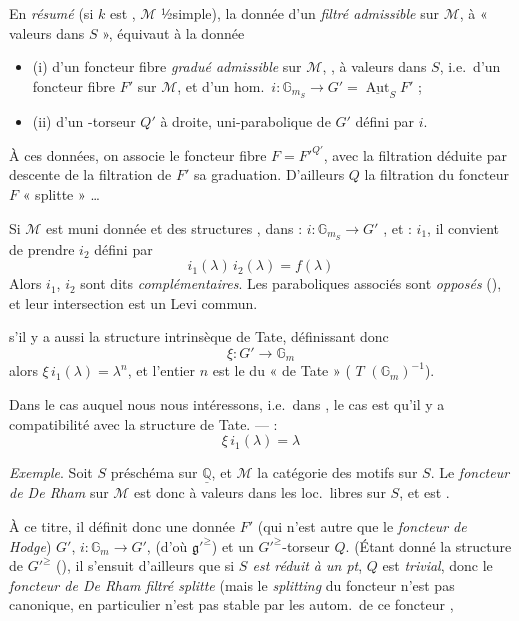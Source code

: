 \documentclass[11pt,a4paper]{article}
\begin{document}
En \emph{résumé} (si $k$ est \ill{}, $\mathcal{M}$ ½simple), la donnée d'un
  \emph{filtré admissible} sur $\mathcal{M}$, à
« valeurs dans $S$ », équivaut à la donnée
\begin{itemize}
  \item (i) d'un foncteur fibre \emph{gradué admissible} sur $\mathcal{M}$,
        , à valeurs dans $S$, i.e.\ d'un foncteur fibre $F'$ sur
        $\mathcal{M}$, et d'un hom.\ $i : \mathbb{G}_{m_{S}} \longrightarrow G' =
        \underline{\operatorname{Aut}}_{S} F'$ ;
  \item (ii) d'un -torseur  $Q'$ à droite,
        \ill{}   uni-parabolique de $G'$ défini par
        $i$.
\end{itemize}

À ces données, on associe le foncteur fibre $F = F'^{Q'}$, avec la filtration
déduite par descente de la filtration  de $F'$
 \ill{} sa graduation. D'ailleurs $Q$ \ill{} la filtration du
foncteur $F$ « splitte » …

Si $\mathcal{M}$ est muni   donnée \ill{} et des
structures , \ill{} dans \ill{} :
$i : \mathbb{G}_{m_{S}} \to G'$ \ill{} , et : $i_{1}$, il
convient de prendre $i_{2}$ défini par
\[
i_{1}(\lambda)\, i_{2}(\lambda) = f(\lambda)
\]
Alors $i_{1}$, $i_{2}$ sont dits \emph{complémentaires}. Les paraboliques
associés sont \emph{opposés} (\struck{\ill{}}), et leur intersection est un
Levi commun.

s'il y a aussi la structure intrinsèque de Tate, définissant donc
\[
\xi : G' \longrightarrow \mathbb{G}_{m}
\]
alors $\xi\, i_{1}(\lambda) = \lambda^{n}$, et l'entier $n$ est le
 du \struck{\ill{}} «  de Tate »
 ( $T$ 
$(\mathbb{G}_{m})^{-1}$).

Dans le cas auquel nous nous intéressons, i.e.\ dans \ill{}, \ill{} le cas est
qu'il y a compatibilité avec la structure de Tate. ---  :
\[
\xi\, i_{1}(\lambda) = \lambda
\]

\emph{Exemple}. Soit $S$ préschéma  sur $\underline{\mathbb{Q}}$,
et $\mathcal{M}$ la catégorie des motifs sur $S$. Le \emph{foncteur de De
Rham} sur $\mathcal{M}$ est donc à valeurs dans les  loc.\ libres sur $S$, et est .

À ce titre, il définit donc une donnée $F'$ (qui n'est autre que le
\emph{foncteur de Hodge}) \struck{\ill{}} $G'$,
$i : \mathbb{G}_{m} \longrightarrow G'$, (d'où $\mathfrak{g}'^{\geq}$) et un
$G'^{\geq}$-torseur $Q$. (Étant donné la structure de $G'^{\geq}$
(), il s'ensuit d'ailleurs que si \emph{$S$ est réduit à
un pt}, $Q$ est \emph{trivial}, donc le \emph{foncteur de De Rham filtré
splitte} (mais le \emph{splitting} du foncteur n'est pas canonique, en
particulier n'est pas stable par les autom.\ de ce foncteur ,
\end{document}
